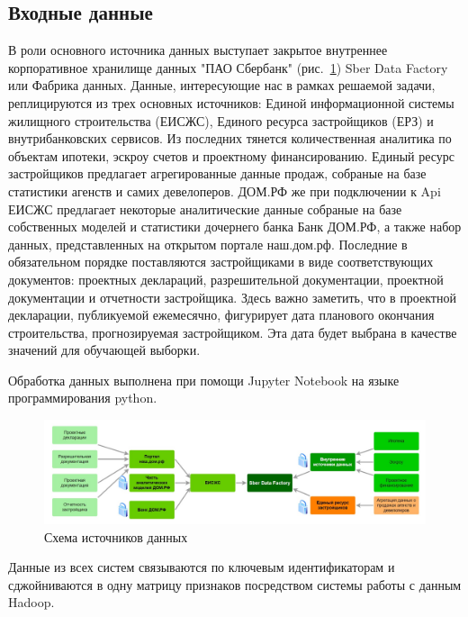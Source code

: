 \documentclass[12pt,a4paper]{article} %
\begin{document}
\subsection{Входные данные}

В роли основного источника данных выступает закрытое внутреннее корпоративное хранилище данных "ПАО Сбербанк" (рис.~\ref{fig:data_source}) Sber Data Factory или Фабрика данных. Данные, интересующие нас в рамках решаемой задачи,  реплицируются из трех основных источников: Единой информационной системы жилищного строительства (ЕИСЖС), Единого ресурса застройщиков (ЕРЗ)\cite{erz} и внутрибанковских сервисов. Из последних тянется количественная аналитика по объектам ипотеки, эскроу счетов и проектному финансированию. Единый ресурс застройщиков предлагает агрегированные данные продаж, собраные на базе статистики агенств и самих девелоперов. ДОМ.РФ же при подключении к Api ЕИСЖС  предлагает некоторые аналитические данные собраные на базе собственных моделей и статистики дочернего банка Банк ДОМ.РФ, а также набор данных, представленных на открытом портале наш.дом.рф\cite{domrf}. Последние в обязательном порядке поставляются застройщиками в виде соответствующих документов: проектных деклараций, разрешительной документации, проектной документации и отчетности застройщика. 
Здесь важно заметить, что в проектной декларации, публикуемой ежемесячно, фигурирует дата планового окончания строительства, прогнозируемая застройщиком. Эта дата будет выбрана в качестве значений для обучающей выборки.  

Обработка данных выполнена при помощи Jupyter Notebook на языке программирования python.

\begin{figure}[h]
	
	\centering
	
	\includegraphics[width=\linewidth]{data_source.jpg}
	
	\caption{Схема источников данных}
	
	\label{fig:data_source}
	
\end{figure}

Данные из всех систем связываются по ключевым идентификаторам и сджойниваются в одну матрицу признаков посредством системы работы с данным Hadoop.
\end{document}
